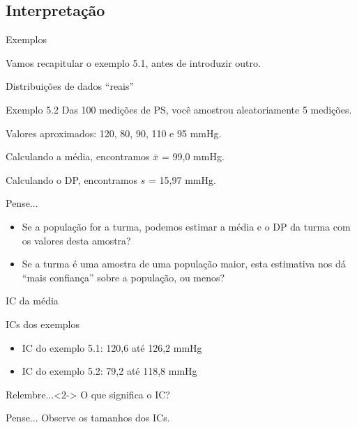 \documentclass{beamer}
\begin{document}
\subsection{Interpretação}

\begin{frame}{\scriptsize Exemplos}
  \begin{center}
    Vamos recapitular o exemplo 5.1, antes de introduzir outro.
  \end{center}
\end{frame}


\begin{frame}{\scriptsize Distribuições de dados ``reais''}
  \begin{exampleblock}{Exemplo 5.2}
    \scriptsize
    Das 100 medições de PS, você amostrou aleatoriamente 5 medições.

    Valores aproximados: 120, 80, 90, 110 e 95 mmHg.

    \bigskip
    Calculando a média, encontramos $\bar{x}$ = 99,0 mmHg.

    Calculando o DP, encontramos $s$ = 15,97 mmHg.
  \end{exampleblock}
  \begin{block}{Pense...}
    \footnotesize
    \begin{itemize}
      \scriptsize
    \item Se a população for a turma, podemos estimar a média e o DP da turma com os valores desta amostra?
    \item Se a turma é uma amostra de uma população maior, esta estimativa nos dá ``mais confiança'' sobre a população, ou menos?
    \end{itemize}
  \end{block}
\end{frame}

\begin{frame}{\scriptsize IC da média}
  \begin{exampleblock}{ICs dos exemplos}
    \footnotesize
    \begin{itemize}
      \footnotesize
    \item IC do exemplo 5.1: 120,6 até 126,2 mmHg
        \medskip
    \item IC do exemplo 5.2: 79,2 até 118,8 mmHg
    \end{itemize}
  \end{exampleblock}
  \begin{block}{Relembre...}<2->
    \footnotesize
    O que significa o IC?
  \end{block}
  \begin{block}{Pense...}
    \footnotesize
    Observe os tamanhos dos ICs.
  \end{block}
\end{frame}
\end{document}
